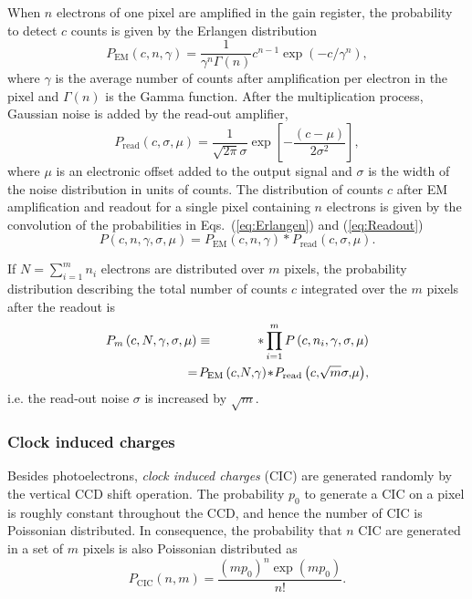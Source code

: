 \documentclass[aps,prl,twocolumn,english,showpacs]{revtex4-1}
\begin{document}
When $n$ electrons of one pixel are amplified in the gain register, the probability to detect $c$ counts is given by the Erlangen distribution~\cite{citeulike:10216617}
\begin{equation}\label{eq:Erlangen}
P_\text{EM}\left( c,n,\gamma \right) =\frac{1}{\gamma^{n}\Gamma \left( n\right) }c^{n-1}\exp \left( -{c}/{\gamma^{n}}\right),
\end{equation}
where $\gamma$ is the average number of counts after amplification per electron in the pixel and $\Gamma(n)$ is the Gamma function. After the multiplication process, Gaussian noise is added by the read-out amplifier,
\begin{equation}\label{eq:Readout}
P_{\text{read}}\left( c,\sigma,\mu\right) =\frac{1}{\sqrt{2\pi }\sigma}\exp \left[-\frac{\left( c-\mu \right) }{2\sigma ^{2}}\right],
\end{equation}
where $\mu$ is an electronic offset added to the output signal and $\sigma$ is the width of the noise distribution in units of counts. The distribution of counts $c$ after EM amplification and readout for a single pixel containing $n$ electrons is given by the convolution of the probabilities in Eqs.~(\ref{eq:Erlangen}) and (\ref{eq:Readout})
\begin{equation}\label{eq:SinglePixelCounts}
P\left( c,n,\gamma,\sigma,\mu \right) = %
P_\text{EM}\left( c,n,\gamma \right) \ast%
P_{\text{read}}\left( c,\sigma,\mu \right). 
\end{equation}

If $N = \sum_{i=1}^m n_i$ electrons are distributed over $m$ pixels, the probability distribution describing the total number of counts $c$ integrated over the $m$ pixels after the readout is
\begin{eqnarray}\label{eq:NcharegesinMPixels}
P_{m} \left(c,N,\gamma,\sigma,\mu \right)& \equiv & \ast \prod_{i=1}^{m}P\left(c,n_{i},\gamma,\sigma,\mu\right) \\
 & & \mkern-50mu = \!P_\text{EM}\left(c,\!N,\!\gamma \right)\!\ast\! P_{\text{read}}\left( c,\!\sqrt{m}\sigma,\!\mu\right)\!,
\end{eqnarray}
i.e. the read-out noise $\sigma$ is increased by $\sqrt{m}$.\\

\subsubsection{Clock induced charges}

Besides photoelectrons, \emph{clock induced charges} (CIC) are generated randomly by the vertical CCD shift operation. The probability $p_{0}$ to generate a CIC on a pixel is roughly constant throughout the CCD, and hence the number of CIC is Poissonian distributed. In consequence, the probability that $n$ CIC are generated in a set of $m$ pixels is also Poissonian distributed as
\begin{equation}\label{eq:PCIC}
P_{\text{CIC}}\left( n,m\right) =\frac{\left( mp_{0}\right) ^{n}\exp (mp_{0})}{n!}.
\end{equation}
\end{document}
